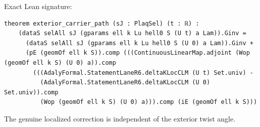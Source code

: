 \begin{theorem}[bp-048]
\par Exact Lean signature:
\begin{verbatim}
theorem exterior_carrier_path (sJ : PlaqSel) (t : ℝ) :
    (dataS selAll sJ (gparams ell k Lu hell0 S (U t) a Lam)).Ginv =
      (dataS selAll sJ (gparams ell k Lu hell0 S (U 0) a Lam)).Ginv +
      (pE (geomOf ell k S)).comp (((ContinuousLinearMap.adjoint (Wop (geomOf ell k S) (U 0) a)).comp
        (((AdalyFormal.StatementLaneR6.deltaKLocCLM (U t) Set.univ) -
          (AdalyFormal.StatementLaneR6.deltaKLocCLM (U 0) Set.univ)).comp
          (Wop (geomOf ell k S) (U 0) a))).comp (iE (geomOf ell k S)))
\end{verbatim}
\end{theorem}

\begin{theorem}[bp-049]
\label{bp-049}
\uses{}
\leanok
The genuine localized correction is independent of the exterior twist angle.


\end{theorem}

